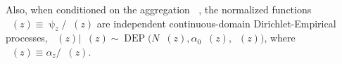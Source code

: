 \documentclass[12pt]{report}
\DeclareMathOperator{\Drm}{\mathrm{D}}
\DeclareMathOperator{\Prm}{\mathrm{P}}
\DeclareMathOperator{\Erm}{\mathrm{E}}
\DeclareMathOperator{\DEP}{\mathrm{DEP}}
\DeclareMathOperator{\uppsim}{\uppsi_\text{m}}
\DeclareMathOperator{\uppsic}{\uppsi_\text{c}}
\DeclareMathOperator{\alpham}{\alpha_\text{m}}
\DeclareMathOperator{\alphac}{\alpha_\text{c}}
\begin{document}
Also, when conditioned on the aggregation $\uppsim$, the normalized functions $\uppsic(z) \equiv \uppsi_z / \uppsim(z)$ are independent continuous-domain Dirichlet-Empirical processes, $\uppsic(z) | \uppsim(z) \sim \DEP\big(N \uppsim(z), \alpha_0 \alpham(z), \alphac(z)\big)$, where $\alphac(z) \equiv \alpha_z / \alpham(z)$.







%
%
%
\end{document}
